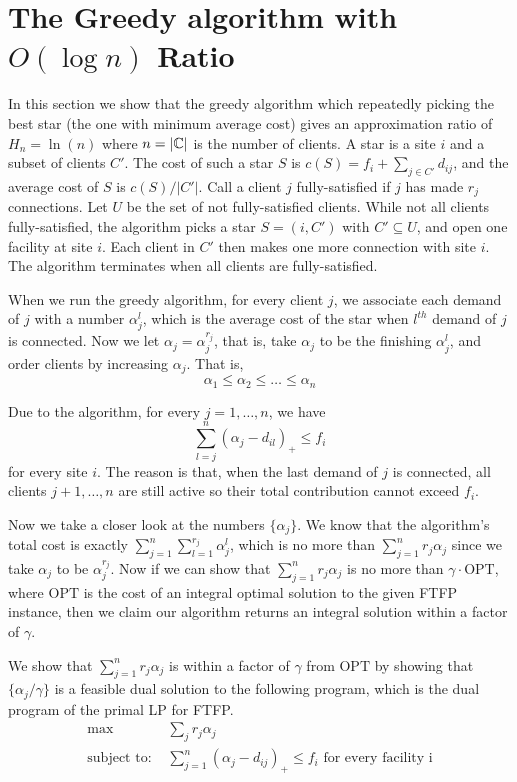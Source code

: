 \documentclass[oneside,final]{ucr}
\begin{document}
\section{The Greedy algorithm with $O(\log n)$ Ratio}
\label{sec:upp}
In this section we show that the greedy algorithm which
repeatedly picking the best star (the one with minimum
average cost) gives an approximation ratio of $H_n = \ln(n)$
where $n=|\mathbb{C}|$ is the number of clients. A star is a
site $i$ and a subset of clients $C'$. The cost of such a
star $S$ is $c(S) = f_i + \sum_{j\in C'} d_{ij}$, and the
average cost of $S$ is $c(S) / |C'|$. Call a client $j$
fully-satisfied if $j$ has made $r_j$ connections. Let $U$
be the set of not fully-satisfied clients. While not all
clients fully-satisfied, the algorithm picks a star
$S=(i,C')$ with $C' \subseteq U$, and open one facility at
site $i$. Each client in $C'$ then makes one more connection
with site $i$. The algorithm terminates when all clients are
fully-satisfied.

When we run the greedy algorithm, for every client $j$, we
associate each demand of $j$ with a number $\alpha_j^l$,
which is the average cost of the star when $l^{th}$ demand
of $j$ is connected. Now we let $\alpha_j = \alpha_j^{r_j}$,
that is, take $\alpha_j$ to be the finishing $\alpha_j^l$,
and order clients by increasing $\alpha_j$. That is,
\begin{equation*}
  \alpha_1 \leq \alpha_2 \leq \ldots \leq \alpha_n
\end{equation*}

Due to the algorithm, for every $j=1,\ldots,n$, we have
\begin{equation*}
  \sum_{l=j}^n (\alpha_j - d_{il})_+ \leq f_i
\end{equation*}
for every site $i$.  The reason is that, when the last
demand of $j$ is connected, all clients $j+1,\ldots,n$ are
still active so their total contribution cannot exceed
$f_i$.

Now we take a closer look at the numbers $\{\alpha_j\}$. We
know that the algorithm's total cost is exactly
$\sum_{j=1}^n \sum_{l=1}^{r_j} \alpha_j^l$, which is no more
than $\sum_{j=1}^n r_j \alpha_j$ since we take $\alpha_j$ to
be $\alpha_j^{r_j}$. Now if we can show that $\sum_{j=1}^n
r_j \alpha_j$ is no more than $\gamma \cdot \textrm{OPT}$,
where $\textrm{OPT}$ is the cost of an integral optimal
solution to the given FTFP instance, then we claim our
algorithm returns an integral solution within a factor of
$\gamma$.

We show that $\sum_{j=1}^n r_j \alpha_j$ is within a factor
of $\gamma$ from $\textrm{OPT}$ by showing that
$\{\alpha_j/\gamma\}$ is a feasible dual solution to the
following program, which is the dual program of the primal
LP for FTFP.
\begin{align*}
  \max\; &\sum_j r_j\alpha_j\\
  \textrm{subject to: }& \sum_{j=1}^n (\alpha_j - d_{ij})_+
  \leq f_i \textrm{ for every facility i}\\
\end{align*}
\end{document}
